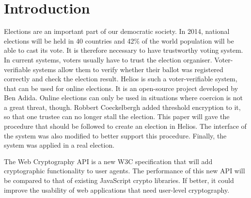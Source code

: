 % 
%

\section{Introduction}

Elections are an important part of our democratic society. In 2014, national elections will be held in 40 countries and 42\% of the world population will be able to cast its vote.\cite{news:economist_2014_ballot_boxes} It is therefore necessary to have trustworthy voting system. In current systems, voters usually have to trust the election organiser. Voter-verifiable systems allow them to verify whether their ballot was registered correctly and check the election result. Helios is such a voter-verifiable system, that can be used for online elections. It is an open-source project developed by Ben Adida.\cite{site:adida_helios_documentation} Online elections can only be used in situations where coercion is not a great threat, though. Robbert Coeckelbergh added threshold encryption to it, so that one trustee can no longer stall the election.\cite{coeckelbergh_application_and_extension_of_the_helios_voting_system} This paper will gave the procedure that should be followed to create an election in Helios. The interface of the system was also modified to better support this procedure. Finally, the system was applied in a real election.

\par The Web Cryptography API is a new W3C specification that will add cryptographic functionality to user agents.\cite{sleevi_watson_web_cryptography_api} The performance of this new API will be compared to that of existing JavaScript crypto libraries. If better, it could improve the usability of web applications that need user-level cryptography.
